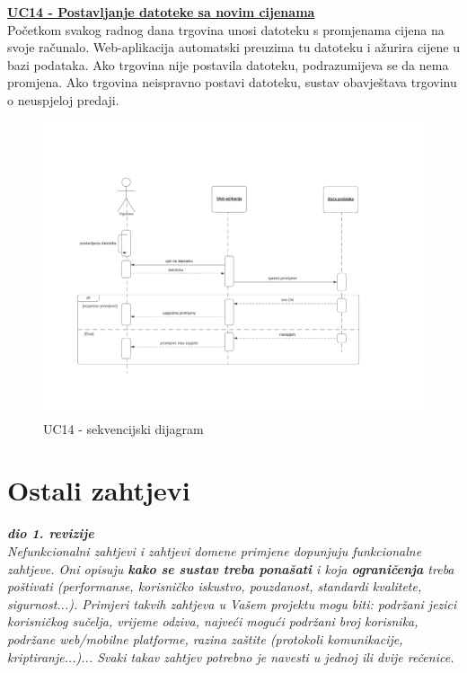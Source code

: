 			\underline{\textbf{UC14 - Postavljanje datoteke sa novim cijenama}}\\
				
				Početkom svakog radnog dana trgovina unosi datoteku s promjenama cijena na svoje računalo. Web-aplikacija automatski preuzima tu datoteku i ažurira cijene u bazi podataka. Ako trgovina nije postavila datoteku, podrazumijeva se da nema promjena. Ako trgovina neispravno postavi datoteku, sustav obavještava trgovinu o neuspjeloj predaji.
				
				\begin{figure}[H]
			\includegraphics[width=\textwidth]{slike/uc14.PNG} %
			\caption{UC14 - sekvencijski dijagram}
			\label{fig:promjene2} %
			\end{figure}
				\eject
	
		\section{Ostali zahtjevi}
		
			\textbf{\textit{dio 1. revizije}}\\
		 
			 \textit{Nefunkcionalni zahtjevi i zahtjevi domene primjene dopunjuju funkcionalne zahtjeve. Oni opisuju \textbf{kako se sustav treba ponašati} i koja \textbf{ograničenja} treba poštivati (performanse, korisničko iskustvo, pouzdanost, standardi kvalitete, sigurnost...). Primjeri takvih zahtjeva u Vašem projektu mogu biti: podržani jezici korisničkog sučelja, vrijeme odziva, najveći mogući podržani broj korisnika, podržane web/mobilne platforme, razina zaštite (protokoli komunikacije, kriptiranje...)... Svaki takav zahtjev potrebno je navesti u jednoj ili dvije rečenice.}
			 
			 
		